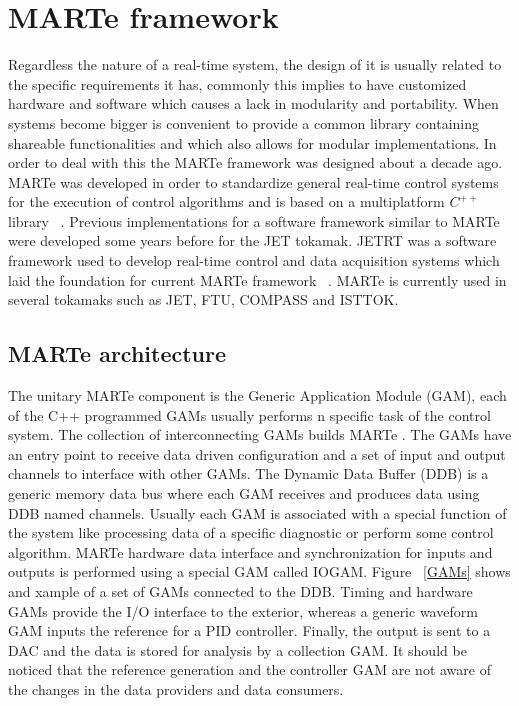 \section{MARTe framework}
Regardless the nature of a real-time system, the design of it is usually related to the specific requirements it has, commonly this implies to have customized hardware and software which causes a lack in modularity and portability. When systems become bigger is convenient to provide a common library containing shareable functionalities and which also allows for modular implementations. In order to deal with this the MARTe framework was designed about a decade ago. MARTe was developed in order to standardize general real-time control systems for the execution of control algorithms and is based on a multiplatform $C^{++}$ library ~\cite{Neto2010}.  Previous implementations for a  software framework similar to MARTe were developed some years before for the JET tokamak. JETRT was a software framework used to develop real-time control and data acquisition systems which laid the foundation for current MARTe framework ~\cite{JETRT}. MARTe is currently used in several tokamaks such as JET, FTU, COMPASS and ISTTOK. 

\subsection{MARTe architecture }
The unitary MARTe component is the Generic Application Module (GAM), each of the C++ programmed GAMs usually performs n specific task of the control system. The collection of interconnecting GAMs builds MARTe  \cite{Neto2011}. The GAMs  have an entry point to receive data driven configuration and a set of input and output channels to interface with other GAMs. The Dynamic Data Buffer (DDB) is a generic memory data bus where each GAM receives and produces data using DDB named channels. Usually each GAM is associated with a special function of the system like processing data of a specific diagnostic or perform some  control algorithm. MARTe hardware data interface and synchronization for inputs and outputs is performed using a special GAM called IOGAM. Figure ~\ref{GAMs} shows and xample of a set of GAMs connected to the DDB. Timing and hardware GAMs provide the I/O interface to the exterior, whereas a generic waveform GAM inputs the reference for a PID controller. Finally, the output is sent to a DAC and the data is stored for analysis by a collection GAM.  It should be noticed that the reference generation and the controller GAM are not aware of the changes in the data providers and data consumers.


